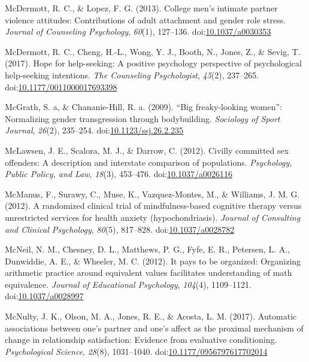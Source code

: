 \documentclass[english,man]{apa6}
\theoremstyle{definition}
\theoremstyle{definition}
\theoremstyle{definition}
\theoremstyle{remark}
\begin{document}
\hypertarget{ref-McDermott2013}{}
McDermott, R. C., \& Lopez, F. G. (2013). College men's intimate partner
violence attitudes: Contributions of adult attachment and gender role
stress. \emph{Journal of Counseling Psychology}, \emph{60}(1), 127--136.
doi:\href{https://doi.org/10.1037/a0030353}{10.1037/a0030353}

\hypertarget{ref-McDermott2017}{}
McDermott, R. C., Cheng, H.-L., Wong, Y. J., Booth, N., Jones, Z., \&
Sevig, T. (2017). Hope for help-seeking: A positive psychology
perspective of psychological help-seeking intentions. \emph{The
Counseling Psychologist}, \emph{45}(2), 237--265.
doi:\href{https://doi.org/10.1177/0011000017693398}{10.1177/0011000017693398}

\hypertarget{ref-McGrath2009}{}
McGrath, S. a, \& Chananie-Hill, R. a. (2009). ``Big freaky-looking
women'': Normalizing gender transgression through bodybuilding.
\emph{Sociology of Sport Journal}, \emph{26}(2), 235--254.
doi:\href{https://doi.org/10.1123/ssj.26.2.235}{10.1123/ssj.26.2.235}

\hypertarget{ref-McLawsen2012}{}
McLawsen, J. E., Scalora, M. J., \& Darrow, C. (2012). Civilly committed
sex offenders: A description and interstate comparison of populations.
\emph{Psychology, Public Policy, and Law}, \emph{18}(3), 453--476.
doi:\href{https://doi.org/10.1037/a0026116}{10.1037/a0026116}

\hypertarget{ref-McManus2012}{}
McManus, F., Surawy, C., Muse, K., Vazquez-Montes, M., \& Williams, J.
M. G. (2012). A randomized clinical trial of mindfulness-based cognitive
therapy versus unrestricted services for health anxiety
(hypochondriasis). \emph{Journal of Consulting and Clinical Psychology},
\emph{80}(5), 817--828.
doi:\href{https://doi.org/10.1037/a0028782}{10.1037/a0028782}

\hypertarget{ref-McNeil2012}{}
McNeil, N. M., Chesney, D. L., Matthews, P. G., Fyfe, E. R., Petersen,
L. A., Dunwiddie, A. E., \& Wheeler, M. C. (2012). It pays to be
organized: Organizing arithmetic practice around equivalent values
facilitates understanding of math equivalence. \emph{Journal of
Educational Psychology}, \emph{104}(4), 1109--1121.
doi:\href{https://doi.org/10.1037/a0028997}{10.1037/a0028997}

\hypertarget{ref-McNulty2017}{}
McNulty, J. K., Olson, M. A., Jones, R. E., \& Acosta, L. M. (2017).
Automatic associations between one's partner and one's affect as the
proximal mechanism of change in relationship satisfaction: Evidence from
evaluative conditioning. \emph{Psychological Science}, \emph{28}(8),
1031--1040.
doi:\href{https://doi.org/10.1177/0956797617702014}{10.1177/0956797617702014}
\end{document}
